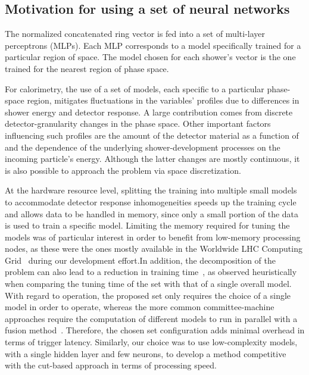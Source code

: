 \subsection{Motivation for using a set of neural networks}\label{ssec:nn_set}

The normalized concatenated ring vector is fed into a set of multi-layer perceptrons (MLPs). 
Each MLP corresponds to a model specifically trained for a particular region of \eteta space.
The model chosen for each shower's vector is the one trained for the nearest region of phase space.

For calorimetry, the use of a set of models, each specific to a particular phase-space region, mitigates fluctuations in the variables' profiles
due to differences in shower energy and detector response.
A large contribution comes from discrete detector-granularity changes in the phase space. Other important factors 
influencing such profiles are the
amount of the detector material as a function of \abseta{} and the dependence of the
underlying shower-development processes on the incoming
particle's energy. Although the latter changes are mostly continuous, it is also
possible to approach the problem via space discretization.

At the hardware resource level, splitting the training into multiple small models to accommodate detector response inhomogeneities speeds up the training cycle and allows data to be handled in memory, since only a small portion of the data is used to train a specific model. Limiting the memory required for tuning the models was of particular interest in order to benefit from low-memory processing nodes, as these were the ones mostly available in the Worldwide LHC Computing Grid~\cite{2015_lcg_tdr} during our development effort.\@ In addition, the decomposition of the problem can also lead to a reduction in training time~\cite{Polikar2006}, as observed heuristically
when comparing the tuning time of the set with that of a single overall model. 
With regard to operation, the proposed set only requires the choice of a
single model in order to operate, whereas the more common committee-machine approaches
require the computation of different models to run in parallel with a fusion
method~\cite{zhou_ensemble}.  Therefore, the chosen set configuration adds
minimal overhead in terms of trigger latency. Similarly, our choice was to
use low-complexity models, with a single hidden layer and few neurons, to develop a method competitive with the cut-based approach in terms of processing speed.



